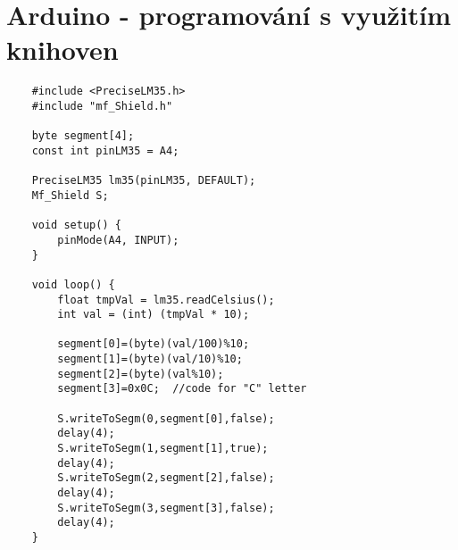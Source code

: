\section{Arduino - programování s využitím knihoven}
\begin{lstlisting}
    #include <PreciseLM35.h>
    #include "mf_Shield.h"
        
    byte segment[4];
    const int pinLM35 = A4;
        
    PreciseLM35 lm35(pinLM35, DEFAULT);
    Mf_Shield S;
        
    void setup() {
        pinMode(A4, INPUT);    
    }
        
    void loop() {
        float tmpVal = lm35.readCelsius();
        int val = (int) (tmpVal * 10);
        
        segment[0]=(byte)(val/100)%10;
        segment[1]=(byte)(val/10)%10;
        segment[2]=(byte)(val%10);
        segment[3]=0x0C;  //code for "C" letter
        
        S.writeToSegm(0,segment[0],false);
        delay(4); 
        S.writeToSegm(1,segment[1],true);
        delay(4);
        S.writeToSegm(2,segment[2],false);
        delay(4);
        S.writeToSegm(3,segment[3],false);
        delay(4);
    }

\end{lstlisting}
